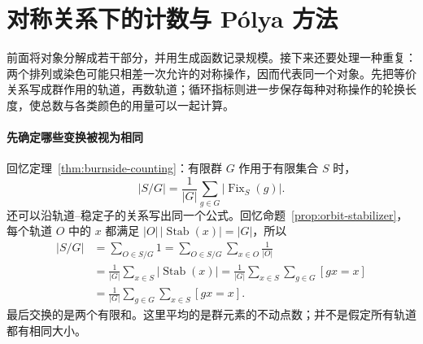 \documentclass[lang=cn,a4paper,fontset=none,zihao=false,10pt,openany,twoside]{beautybook}
\numberwithin{algorithm}{chapter}
\begin{document}
\section{对称关系下的计数与 Pólya 方法}\label{sec:polya-counting}
前面将对象分解成若干部分，并用生成函数记录规模。接下来还要处理一种重复：两个排列或染色可能只相差一次允许的对称操作，因而代表同一个对象。先把等价关系写成群作用的轨道，再数轨道；循环指标则进一步保存每种对称操作的轮换长度，使总数与各类颜色的用量可以一起计算。

\paragraph{先确定哪些变换被视为相同}
回忆定理~\ref{thm:burnside-counting}：有限群 $G$ 作用于有限集合 $S$ 时，
\[
 |S/G|=\frac1{|G|}\sum_{g\in G}|\operatorname{Fix}_S(g)|.
\]
还可以沿轨道--稳定子的关系写出同一个公式。回忆命题~\ref{prop:orbit-stabilizer}，每个轨道 $O$ 中的 $x$ 都满足 $|O|\,|\operatorname{Stab}(x)|=|G|$，所以
\[
 \begin{aligned}
 |S/G|
 &=\sum_{O\in S/G}1
 =\sum_{O\in S/G}\sum_{x\in O}\frac1{|O|}\\
 &=\frac1{|G|}\sum_{x\in S}|\operatorname{Stab}(x)|
 =\frac1{|G|}\sum_{x\in S}\sum_{g\in G}[gx=x]\\
 &=\frac1{|G|}\sum_{g\in G}\sum_{x\in S}[gx=x].
 \end{aligned}
\]
最后交换的是两个有限和。这里平均的是群元素的不动点数；并不是假定所有轨道都有相同大小。
\end{document}
